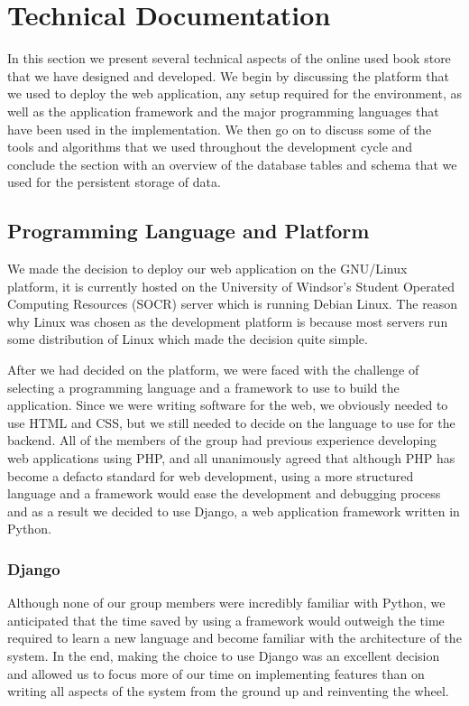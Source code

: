 \documentclass[11pt]{article}
\begin{document}
\section{Technical Documentation}

In this section we present several technical aspects of the online
used book store that we have designed and developed.  We begin by
discussing the platform that we used to deploy the web application,
any setup required for the environment, as well as the application
framework and the major programming languages that have been used in
the implementation. We then go on to discuss some of the tools and
algorithms that we used throughout the development cycle and conclude
the section with an overview of the database tables and schema that we
used for the persistent storage of data.

\subsection{Programming Language and Platform}

We made the decision to deploy our web application on the GNU/Linux
platform, it is currently hosted on the University of Windsor's
Student Operated Computing Resources (SOCR) server which is running
Debian Linux. The reason why Linux was chosen as the development
platform is because most servers run some distribution of Linux which
made the decision quite simple.

After we had decided on the platform, we were faced with the challenge
of selecting a programming language and a framework to use to build
the application. Since we were writing software for the web, we
obviously needed to use HTML and CSS, but we still needed to decide on
the language to use for the backend. All of the members of the group
had previous experience developing web applications using PHP, and all
unanimously agreed that although PHP has become a defacto standard for
web development, using a more structured language and a framework
would ease the development and debugging process and as a result we
decided to use Django, a web application framework written in Python.

\subsubsection{Django}

Although none of our group members were incredibly familiar with
Python, we anticipated that the time saved by using a framework would
outweigh the time required to learn a new language and become familiar
with the architecture of the system. In the end, making the choice to
use Django was an excellent decision and allowed us to focus more of
our time on implementing features than on writing all aspects of the
system from the ground up and reinventing the wheel.
\end{document}

